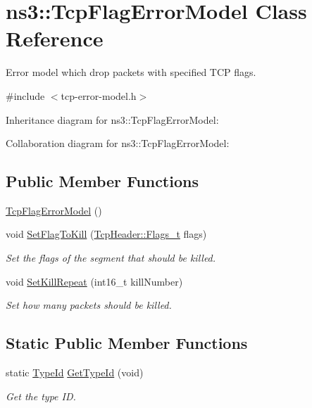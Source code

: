 \hypertarget{classns3_1_1TcpFlagErrorModel}{}\section{ns3\+:\+:Tcp\+Flag\+Error\+Model Class Reference}
\label{classns3_1_1TcpFlagErrorModel}


Error model which drop packets with specified T\+CP flags.  




{\ttfamily \#include $<$tcp-\/error-\/model.\+h$>$}



Inheritance diagram for ns3\+:\+:Tcp\+Flag\+Error\+Model\+:


Collaboration diagram for ns3\+:\+:Tcp\+Flag\+Error\+Model\+:
\subsection*{Public Member Functions}
\begin{DoxyCompactItemize}
\item 
\hyperlink{classns3_1_1TcpFlagErrorModel_ac6094d1d0a91dbc3ebf326ff7b177a70}{Tcp\+Flag\+Error\+Model} ()
\item 
void \hyperlink{classns3_1_1TcpFlagErrorModel_a18a0b76ecf145bd3d28df7239207bd8c}{Set\+Flag\+To\+Kill} (\hyperlink{classns3_1_1TcpHeader_a5f3d432941327854b5ad621e467479c6}{Tcp\+Header\+::\+Flags\+\_\+t} flags)
\begin{DoxyCompactList}\small\item\em Set the flags of the segment that should be killed. \end{DoxyCompactList}\item 
void \hyperlink{classns3_1_1TcpFlagErrorModel_a97071fba6dfb851b41af2f6d42d01f54}{Set\+Kill\+Repeat} (int16\+\_\+t kill\+Number)
\begin{DoxyCompactList}\small\item\em Set how many packets should be killed. \end{DoxyCompactList}\end{DoxyCompactItemize}
\subsection*{Static Public Member Functions}
\begin{DoxyCompactItemize}
\item 
static \hyperlink{classns3_1_1TypeId}{Type\+Id} \hyperlink{classns3_1_1TcpFlagErrorModel_a739cc26d2f95ce18d88f0bae9efe2cd7}{Get\+Type\+Id} (void)
\begin{DoxyCompactList}\small\item\em Get the type ID. \end{DoxyCompactList}\end{DoxyCompactItemize}
